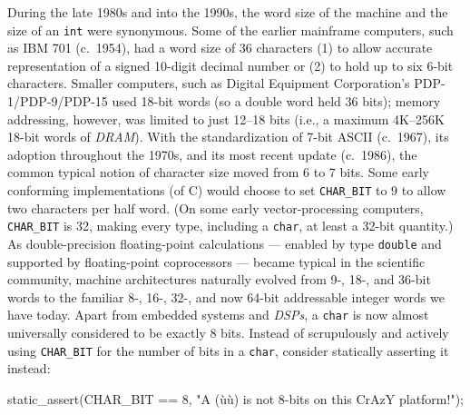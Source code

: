 During the late 1980s and into the 1990s, the word size of the machine and
the size of an \lstinline!int! were synonymous. Some of
the earlier mainframe computers, such as IBM 701 (c.~1954), had a word
size of 36 characters (1) to allow accurate representation of a signed
10-digit decimal number or (2) to hold up to six 6-bit characters.
Smaller computers, such as Digital Equipment Corporation's
PDP-1/PDP-9/PDP-15 used 18-bit words (so a double word held 36 bits);
memory addressing, however, was limited to just 12--18 bits (i.e., a
maximum 4K--256K 18-bit words of \emph{DRAM}). With the standardization
of 7-bit ASCII (c.~1967), its adoption throughout the 1970s, and its most
recent update (c.~1986), the common typical notion of character size
moved from 6 to 7 bits. Some early conforming implementations (of C)
would choose to set \lstinline!CHAR_BIT! to 9 to allow two characters
per half word. (On some early vector-processing computers,
\lstinline!CHAR_BIT! is 32, making every type, including a
\lstinline!char!, at least a 32-bit quantity.) As double-precision floating-point calculations --- enabled by type \lstinline!double! and supported by floating-point coprocessors --- became typical in the scientific community, machine architectures
naturally evolved from 9-, 18-, and 36-bit words to the familiar 8-,
16-, 32-, and now 64-bit addressable integer words we have today.
Apart from embedded systems and \emph{DSPs}, a \lstinline!char! is now
almost universally considered to be exactly 8 bits. Instead of
scrupulously and actively using \lstinline!CHAR_BIT! for the number of bits
in a \lstinline!char!, consider statically asserting it instead:

\begin{emcppslisting}[language=C++]
static_assert(CHAR_BIT == 8, "A (ù{}ù) is not 8-bits on this CrAzY platform!");
\end{emcppslisting}

